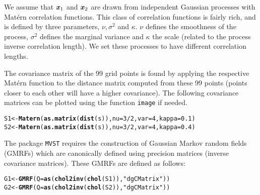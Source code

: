 \documentclass{article}\usepackage[]{graphicx}\usepackage[]{color}
\makeatletter
\newcommand{\hlnum}[1]{\textcolor[rgb]{0.686,0.059,0.569}{#1}}%
\newcommand{\hlstr}[1]{\textcolor[rgb]{0.192,0.494,0.8}{#1}}%
\newcommand{\hlopt}[1]{\textcolor[rgb]{0,0,0}{#1}}%
\newcommand{\hlstd}[1]{\textcolor[rgb]{0.345,0.345,0.345}{#1}}%
\newcommand{\hlkwb}[1]{\textcolor[rgb]{0.69,0.353,0.396}{#1}}%
\newcommand{\hlkwc}[1]{\textcolor[rgb]{0.333,0.667,0.333}{#1}}%
\newcommand{\hlkwd}[1]{\textcolor[rgb]{0.737,0.353,0.396}{\textbf{#1}}}%
\newenvironment{kframe}{%
 \def\at@end@of@kframe{}%
 \ifinner\ifhmode%
  \def\at@end@of@kframe{\end{minipage}}%
  \begin{minipage}{\columnwidth}%
 \fi\fi%
 \def\FrameCommand##1{\hskip\@totalleftmargin \hskip-\fboxsep
 \colorbox{shadecolor}{##1}\hskip-\fboxsep
     \hskip-\linewidth \hskip-\@totalleftmargin \hskip\columnwidth}%
 \MakeFramed {\advance\hsize-\width
   \@totalleftmargin\z@ \linewidth\hsize
   \@setminipage}}%
 {\par\unskip\endMakeFramed%
 \at@end@of@kframe}
\newenvironment{knitrout}{}{} %
\newcommand{\xvec} {\textbf{\textit{x}}}
\makeatother
\begin{document}
We assume that $\xvec_1$ and $\xvec_2$ are drawn from independent Gaussian processes with Mat{\'e}rn correlation functions. This class of correlation functions is fairly rich, and is defined by three parameters, $\nu, \sigma^2$ and $\kappa$. $\nu$ defines the smoothness of the process, $\sigma^2$ defines the marginal variance and $\kappa$ the scale (related to the process inverse correlation length). We set these processes to have different correlation lengths.

The covariance matrix of the 99 grid points is found by applying the respective Mat{\'e}rn function to the distance matrix computed from these 99 points (points closer to each other will have a higher covariance). The following covariance matrices can be plotted using the function \texttt{image} if needed.

\begin{knitrout}
\color{fgcolor}\begin{kframe}
\begin{alltt}
\hlstd{S1} \hlkwb{<-} \hlkwd{Matern}\hlstd{(}\hlkwd{as.matrix}\hlstd{(}\hlkwd{dist}\hlstd{(s)),} \hlkwc{nu} \hlstd{=} \hlnum{3}\hlopt{/}\hlnum{2}\hlstd{,}\hlkwc{var}\hlstd{=}\hlnum{4}\hlstd{,} \hlkwc{kappa} \hlstd{=} \hlnum{0.1}\hlstd{)}
\hlstd{S2} \hlkwb{<-} \hlkwd{Matern}\hlstd{(}\hlkwd{as.matrix}\hlstd{(}\hlkwd{dist}\hlstd{(s)),} \hlkwc{nu} \hlstd{=} \hlnum{3}\hlopt{/}\hlnum{2}\hlstd{,}\hlkwc{var}\hlstd{=}\hlnum{4}\hlstd{,} \hlkwc{kappa} \hlstd{=} \hlnum{0.4}\hlstd{)}
\end{alltt}
\end{kframe}
\end{knitrout}

The package \texttt{MVST} requires the construction of Gaussian Markov random fields (GMRFs) which are canonically defined using precision matrices (inverse covariance matrices). These GMRFs are defined as follows:

\begin{knitrout}
\color{fgcolor}\begin{kframe}
\begin{alltt}
\hlstd{G1} \hlkwb{<-} \hlkwd{GMRF}\hlstd{(}\hlkwc{Q}\hlstd{=}\hlkwd{as}\hlstd{(}\hlkwd{chol2inv}\hlstd{(}\hlkwd{chol}\hlstd{(S1)),}\hlstr{"dgCMatrix"}\hlstd{))}
\hlstd{G2} \hlkwb{<-} \hlkwd{GMRF}\hlstd{(}\hlkwc{Q}\hlstd{=}\hlkwd{as}\hlstd{(}\hlkwd{chol2inv}\hlstd{(}\hlkwd{chol}\hlstd{(S2)),}\hlstr{"dgCMatrix"}\hlstd{))}
\end{alltt}
\end{kframe}
\end{knitrout}
\end{document}
